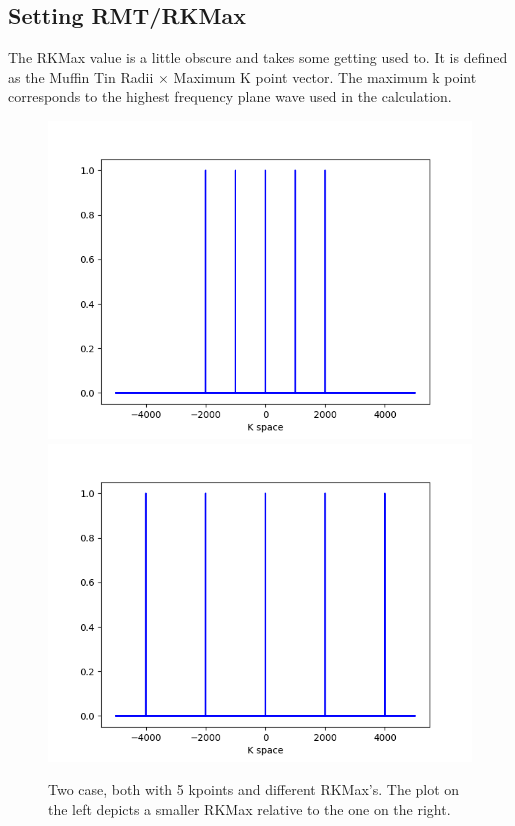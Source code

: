 \documentclass[12pt]{article}
\begin{document}
\subsection{Setting RMT/RKMax}
The RKMax value is a little obscure and takes some getting used to.   It is defined as the Muffin Tin Radii $\times$ Maximum K point vector.   The maximum k point corresponds to the highest frequency plane wave used in the calculation.  

\begin{figure}[H]
	\includegraphics[scale=0.5]{./images/low_rkmax.png}
	\includegraphics[scale=0.5]{./images/high_rkmax.png}	\caption*{Two case, both with 5 kpoints and different RKMax's.  The plot on the left depicts a smaller RKMax relative to the one on the right.}
\end{figure}
\end{document}
